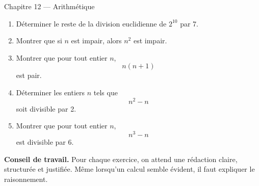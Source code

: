 \documentclass[11pt,a4paper]{article}
\begin{document}
\begin{chapitrebox}{Chapitre 12 --- Arithmétique}
\end{chapitrebox}

\begin{enumerate}[label=\textbf{Exercice \arabic*.}, leftmargin=*, itemsep=1em]

\item Déterminer le reste de la division euclidienne de \(2^{10}\) par 7.

\item Montrer que si \(n\) est impair, alors \(n^2\) est impair.

\item Montrer que pour tout entier \(n\),
\[
n(n+1)
\]
est pair.

\item Déterminer les entiers \(n\) tels que
\[
n^2-n
\]
soit divisible par 2.

\item Montrer que pour tout entier \(n\),
\[
n^3-n
\]
est divisible par 6.
\end{enumerate}

\vspace{1em}

\begin{objectifbox}
\textbf{Conseil de travail.} Pour chaque exercice, on attend une rédaction claire, structurée et justifiée.  
Même lorsqu'un calcul semble évident, il faut expliquer le raisonnement.
\end{objectifbox}
\end{document}
